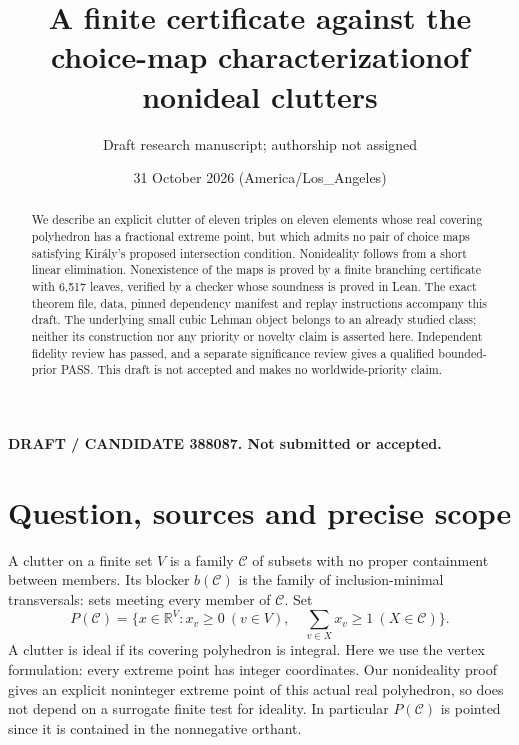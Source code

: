 \documentclass[11pt]{article}
\title{A finite certificate against the choice-map characterization\newline of nonideal clutters}
\author{Draft research manuscript; authorship not assigned}
\date{31 October 2026 (America/Los\_Angeles)}
\newcommand{\C}{\mathcal C}
\newcommand{\R}{\mathbb R}
\begin{document}
\maketitle
\begin{center}\textbf{DRAFT / CANDIDATE 388087. Not submitted or accepted.}\end{center}
\begin{abstract}
We describe an explicit clutter of eleven triples on eleven elements whose real covering polyhedron has a fractional extreme point, but which admits no pair of choice maps satisfying Kir\'aly's proposed intersection condition. Nonideality follows from a short linear elimination. Nonexistence of the maps is proved by a finite branching certificate with 6,517 leaves, verified by a checker whose soundness is proved in Lean. The exact theorem file, data, pinned dependency manifest and replay instructions accompany this draft. The underlying small cubic Lehman object belongs to an already studied class; neither its construction nor any priority or novelty claim is asserted here. Independent fidelity review has passed, and a separate significance review gives a qualified bounded-prior PASS. This draft is not accepted and makes no worldwide-priority claim.
\end{abstract}

\section{Question, sources and precise scope}
A clutter on a finite set $V$ is a family $\C$ of subsets with no proper containment between members. Its blocker $b(\C)$ is the family of inclusion-minimal transversals: sets meeting every member of $\C$. Set
\[
 P(\C)=\{x\in\R^V:x_v\geq0\ (v\in V),\quad
                         \sum_{v\in X}x_v\geq1\ (X\in\C)\}.
\]
A clutter is ideal if its covering polyhedron is integral. Here we use the vertex formulation: every extreme point has integer coordinates. Our nonideality proof gives an explicit noninteger extreme point of this actual real polyhedron, so does not depend on a surrogate finite test for ideality. In particular $P(\C)$ is pointed since it is contained in the nonnegative orthant.
\end{document}
